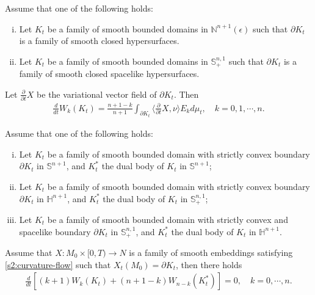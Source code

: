 \documentclass[10pt,a4paper]{amsart}
\newcommand{\e}{\epsilon}
\newcommand{\ra}{\rightarrow}
\begin{document}
\begin{lem}
	Assume that one of the following holds:
	\begin{enumerate}[(i)]
		\item Let $K_t$ be a family of smooth bounded domains in $\mathbb N^{n+1}(\e)$ such that $\partial K_t$ is a family of smooth closed hypersurfaces. 
		\item Let $K_t$ be a family of smooth bounded domains in $\mathbb S^{n,1}_{+}$ such that $\partial K_t$ is a family of smooth closed spacelike hypersurfaces.
    \end{enumerate}
    Let $\frac{\partial}{\partial t}X$ be the variational vector field of $\partial K_t$. Then 
	\begin{align}\label{s3:variational-formula}
	\frac{d}{dt}W_k(K_t)=\frac{n+1-k}{n+1}\int_{\partial K_t} \langle \frac{\partial}{\partial t}X,\nu \rangle E_k d\mu_t, \quad k=0,1,\cdots,n.
	\end{align}	
\end{lem}

\begin{lem}\label{s4:lem-identity}
	Assume that one of the following holds:
	\begin{enumerate}[(i)]
		\item Let $K_t$ be a family of smooth bounded domain with strictly convex boundary $\partial K_t$ in $\mathbb S^{n+1}$, and $K_t^\ast$ the dual body of $K_t$ in $\mathbb S^{n+1}$;
		\item Let $K_t$ be a family of smooth bounded domain with strictly convex boundary $\partial K_t$ in $\mathbb H^{n+1}$, and $K_t^\ast$ the dual body of $K_t$ in $\mathbb S^{n,1}_{+}$;
		\item Let $K_t$ be a family of smooth bounded domain with strictly convex and spacelike boundary $\partial K_t$ in $\mathbb S^{n,1}_{+}$, and $K_t^\ast$ the dual body of $K_t$ in $\mathbb H^{n+1}$.
\end{enumerate}	
	    Assume that $X:M_0 \times [0,T) \ra N$ is a family of smooth embeddings satisfying \eqref{s2:curvature-flow} such that $X_t(M_0)=\partial K_t$, then there holds
	\begin{align}\label{s4:evol-identity}
	\frac{d}{dt}\left[ (k+1)W_k(K_t)+(n+1-k)W_{n-k}(K_t^\ast)\right]=0, \quad k=0,\cdots,n.
	\end{align}
\end{lem}
\end{document}
